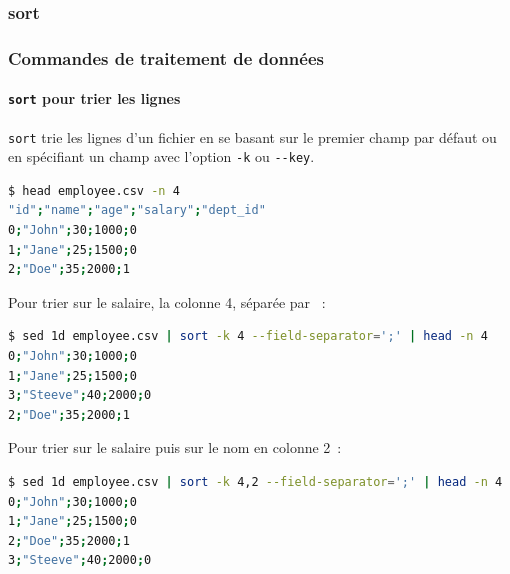 \documentclass{beamer}
\begin{document}
    \subsubsection{sort}\label{subsubsec:sort}
    \begin{frame}[fragile]
        \transdissolve
        \frametitle{Commandes de traitement de données}
        \framesubtitle{\lstinline{sort} pour trier les lignes}
        \lstinline{sort} trie les lignes d'un fichier en se basant sur le premier champ par défaut ou en spécifiant un champ avec l'option \lstinline{-k} ou \lstinline{--key}.
        \begin{lstlisting}[language=bash,basicstyle=\tiny\ttfamily]
$ head employee.csv -n 4
"id";"name";"age";"salary";"dept_id"
0;"John";30;1000;0
1;"Jane";25;1500;0
2;"Doe";35;2000;1
        \end{lstlisting}
        Pour trier sur le salaire, la colonne 4, séparée par \textquote{;}~:
        \begin{lstlisting}[language=bash,basicstyle=\tiny\ttfamily]
$ sed 1d employee.csv | sort -k 4 --field-separator=';' | head -n 4
0;"John";30;1000;0
1;"Jane";25;1500;0
3;"Steeve";40;2000;0
2;"Doe";35;2000;1
        \end{lstlisting}
        Pour trier sur le salaire puis sur le nom en colonne 2~:
        \begin{lstlisting}[language=bash,basicstyle=\tiny\ttfamily]
$ sed 1d employee.csv | sort -k 4,2 --field-separator=';' | head -n 4
0;"John";30;1000;0
1;"Jane";25;1500;0
2;"Doe";35;2000;1
3;"Steeve";40;2000;0
        \end{lstlisting}
    \end{frame}
\end{document}
